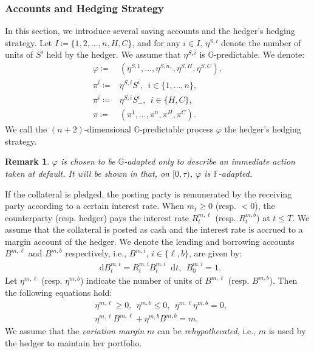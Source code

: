 \documentclass[a4paper, 11pt]{article}              %
\numberwithin{equation}{section}
\theoremstyle{plain}
\newcommand{\1}{\mathds{1}}
\newcommand{\dsF}{\mathbb{F}}
\newcommand{\dsG}{\mathbb{G}}
\theoremstyle{plain}
\theoremstyle{definition}
\newtheorem{remark}[thm]{Remark} %
\theoremstyle{plain}
\newtheorem{remark}{Remark}
\newcommand*\df{\mathop{}\!\mathrm{d}}
\begin{document}
\subsubsection{Accounts and Hedging Strategy}
In this section, we introduce several saving accounts and the hedger's
hedging strategy. Let $I \coloneqq \{1, 2, \dots, n, H, C\}$, and
for any $i \in I$, $\eta^{S, i}$ denote the number of units of $S^i$ held by the
hedger. We assume that $\eta^{S, i}$ is $\dsG$-predictable. We denote:
\begin{align}
  \varphi \coloneqq& (\eta^{S, 1}, \dots, \eta^{S, n, }, \eta^{S, H}, \eta^{S, C}),
                     \nonumber \\
  \pi^i \coloneqq& \eta^{S, i}S^i, ~~i \in \{1, \dots, n\} ,\nonumber \\
\pi^i \coloneqq& \eta^{S, i}S^i_-, ~~i \in \{H, C\} ,\nonumber \\
\pi \coloneqq& (\pi^1, \dots, \pi^n, \pi^H, \pi^C) .\nonumber 
\end{align}
We call the $(n+2)$-dimensional $\dsG$-predictable process $\varphi$ the
hedger's hedging strategy. 
\begin{remark}
  $\varphi$ is chosen to be $\dsG$-adapted only to describe an immediate action
  taken at default. It will be shown in  that, on $[0, \tau)$,
  $\varphi$ is $\dsF$-adapted.
\end{remark}


If the collateral is pledged, the posting party is remunerated by the receiving
party according to a certain interest rate. When $m_t\geq0$ (resp. $<0$), the
counterparty (resp. hedger) pays the interest rate $R^{m, \ell}_t$ (resp.
$R^{m, b}_t$)  at $t \leq T$. We assume  that the collateral is posted
as cash and the interest rate is accrued to a margin account of the hedger. We 
denote the lending and borrowing accounts $B^{m, \ell}$ and $B^{m, b}$
respectively, i.e., $B^{m, i}$, $i \in\{\ell, b\}$,  are given by:
\begin{align}
 \df B^{m, i}_t = R^{m, i}_tB^{m, i}_t\df t, ~~B^{m, i}_0=1.\label{sde:margin}
\end{align}
Let $\eta^{m, \ell}$ (resp. $\eta^{m, b}$) indicate the number of units of
$B^{m, \ell}$ (resp. $B^{m, b}$). Then the following equations hold:
\begin{eqnarray}
  &\eta^{m, \ell} \geq0, ~~\eta^{m, b}\leq0, ~~\eta^{m, \ell}\eta^{m, b}=0, \label{cond:margin1}\\
 & \eta^{m, \ell}B^{m, \ell} + \eta^{m, b}B^{m, b} = m. \label{cond:margin2}
\end{eqnarray}
We assume that the  \textit{variation margin} $m$ can be
\textit{rehypothecated}, i.e., $m$ is used by the hedger to maintain her
portfolio.
\end{document}
